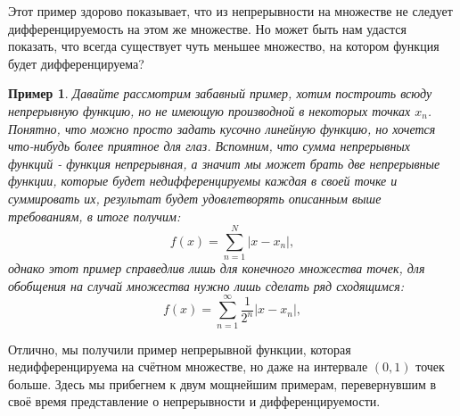 \documentclass{book} %
\newtheorem{example}{Пример}[chapter] %
\theoremstyle{definition}
\theoremstyle{remark}
\begin{document}
		Этот пример здорово показывает, что из непрерывности на множестве не следует дифференцируемость на этом же множестве. Но может быть нам удастся показать, что всегда существует чуть меньшее множество, на котором функция будет дифференцируема?
		\begin{example}
			Давайте рассмотрим забавный пример, хотим построить всюду непрерывную функцию, но не имеющую производной в некоторых точках ${x_n}$. Понятно, что можно просто задать кусочно линейную функцию, но хочется что-нибудь более приятное для глаз. Вспомним, что сумма непрерывных функций - функция непрерывная, а значит мы может брать две непрерывные функции, которые будет недифференцируемы каждая в своей точке и суммировать их, результат будет удовлетворять описанным выше требованиям, в итоге получим: 
			\begin{equation*}
				f(x) = \sum\limits_{n=1}^{N} |x - x_n|, 
			\end{equation*}
			однако этот пример справедлив лишь для конечного множества точек, для обобщения на случай множества нужно лишь сделать ряд сходящимся:
			\begin{equation*}
				f(x) = \sum\limits_{n=1}^{\infty} \dfrac{1}{2^n}|x - x_n|, 
			\end{equation*}
		\end{example}
		
		Отлично, мы получили пример непрерывной функции, которая недифференцируема на счётном множестве, но даже на интервале $(0,1)$ точек больше. Здесь мы прибегнем к двум мощнейшим примерам, перевернувшим в своё время представление о непрерывности и дифференцируемости.
		
\end{document}
